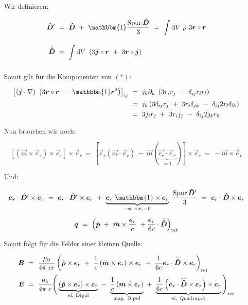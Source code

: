 Wir definieren:

\begin{align*}
\tens{D}'  \ &= \ \tens{D} \ + \ \mathbbm{1}\frac{\operatorname{Spur} \tens{D}}{3}  \ = \  \Int{}{}{V}\rho \ 3 \vec{r}\circ\vec{r}\\
\dot{\tens{D}} \ &= \ \Int{}{}{V}\left(3\vec{j}\circ\vec{r} \ + \ 3 \vec{r}\circ\vec{j}\right)
\end{align*}


Somit gilt für die Komponenten von $(*)$:

\begin{align*}
\left[\left(\vec{j}\cdot\nabla\right) \ \left(3\vec{r}\circ\vec{r} \ - \ \mathbbm{1} \vec{r}^2\right)\right]_{ij}  \ &= \ j_k \partial_k\ \left(3 r_i r_j \ - \ \delta_{ij} r_l r_l\right)\\
&= \ j_k \left(3\delta_{ij}r_j \ + \ 3r_i\delta_{jk} \ - \ \delta_{ij} 2 r_l \delta_{lk}\right)\\
&= \ 3j_i r_j \ + \ 3 r_i j_j \ - \ \delta_{ij} 2 j_k r_k
\end{align*}

Nun brauchen wir noch:

\begin{equation*}
\left[\left(\vec{m}\times\vec{e}_r\right)\times\vec{e}_r\right]\times\vec{e}_r  \ = \ \left[\vec{e}_r(\vec{m}\cdot\vec{e}_r) \ - \ \vec{m}(\underbrace{\vec{e_r}\cdot\vec{e}_r}_{=1})\right] \times \vec{e}_r \ = \ - \vec{m}\times\vec{e}_r
\end{equation*}

Und:

\begin{equation*}
\vec{e_r}\cdot\tens{D}'\times\vec{e}_r  \ = \ \vec{e}_r \cdot\tens{D}'\times\vec{e}_r \ + \ \underbrace{\vec{e}_r \ \mathbbm{1} \times\vec{e}_r}_{=\vec{e}_r\times\vec{r}_r =0} \ \frac{\operatorname{Spur}\tens{D}'}{3}  \ = \ \vec{e}_r\cdot\tens{D}\times\vec{e}_r
\end{equation*}

\begin{equation*}
\dot{\bm{q}}  \ = \  \left(\dot{\bm{p}} \ + \ \dot{\bm{m}} \times\frac{\bm{e}_r}{c} \ + \frac{\bm{e}_r}{6c}\cdot \ddot{\bm{\hat{
D}}}\right)_{\text{ret}}
\end{equation*}

Somit folgt für die Felder einer kleinen Quelle:

\begin{align*}
\vec{B}  \ &= \ \frac{\mu_0}{4\pi \ c r} \left(\ddot{\vec{p}}\times\vec{e}_r \ + \ \frac{1}{c} \left(\ddot{\vec{m}}\times
\vec{e}_r\right) \times\vec{e}_r \ + \ \frac{1}{6c}\vec{e}_r\cdot\dddot{\tens{D}} \times\vec{e}_r\right)_{\text{ret}}\\
\vec{E}  \ &= \ \frac{\mu_0}{4\pi \ c} \Bigg(\underbrace{\left(\ddot{\vec{p}}\times\vec{e}_r\right)\times\vec{e}_r}_{\text{el. Dipol}} \ - \ \underbrace{\frac{1}{c}\left(\ddot{\vec{m}\times\vec{e}_r}\right)}_{\text{mag. Dipol}} \ + \ \underbrace{\frac{1}{6c}\left(\vec{e}_r\cdot\dddot{\tens{D}}\times\vec{e}_r\right)\times\vec{e}_r}_{\text{el. Quadrupol}}\Bigg)_{\text{ret}}
\end{align*}

